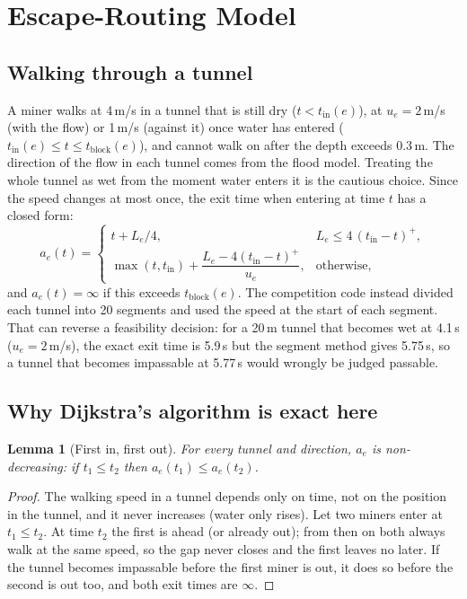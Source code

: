 \documentclass[11pt,a4paper]{article}
\newtheorem{lemma}{Lemma}
\theoremstyle{remark}
\newcommand{\tin}{t_{\mathrm{in}}}
\newcommand{\tblock}{t_{\mathrm{block}}}
\begin{document}
\section{Escape-Routing Model}\label{sec:routing}

\subsection{Walking through a tunnel}
A miner walks at 4\,m/s in a tunnel that is still dry ($t < \tin(e)$), at $u_e = 2$\,m/s (with the flow) or 1\,m/s (against it) once water has entered ($\tin(e) \le t \le \tblock(e)$), and cannot walk on after the depth exceeds 0.3\,m. The direction of the flow in each tunnel comes from the flood model. Treating the whole tunnel as wet from the moment water enters it is the cautious choice. Since the speed changes at most once, the exit time when entering at time $t$ has a closed form:
\begin{equation}
  a_e(t) = \begin{cases}
    t + L_e/4, & L_e \le 4\,(\tin - t)^+,\\[2pt]
    \max(t,\tin) + \dfrac{L_e - 4(\tin - t)^+}{u_e}, & \text{otherwise},
  \end{cases}
  \label{eq:exit}
\end{equation}
and $a_e(t) = \infty$ if this exceeds $\tblock(e)$. The competition code instead divided each tunnel into 20 segments and used the speed at the start of each segment. That can reverse a feasibility decision: for a 20\,m tunnel that becomes wet at 4.1\,s ($u_e = 2$\,m/s), the exact exit time is 5.9\,s but the segment method gives 5.75\,s, so a tunnel that becomes impassable at 5.77\,s would wrongly be judged passable.

\subsection{Why Dijkstra's algorithm is exact here}\label{sec:fifo}

\begin{lemma}[First in, first out]
For every tunnel and direction, $a_e$ is non-decreasing: if $t_1 \le t_2$ then $a_e(t_1) \le a_e(t_2)$.
\end{lemma}
\begin{proof}
The walking speed in a tunnel depends only on time, not on the position in the tunnel, and it never increases (water only rises). Let two miners enter at $t_1 \le t_2$. At time $t_2$ the first is ahead (or already out); from then on both always walk at the same speed, so the gap never closes and the first leaves no later. If the tunnel becomes impassable before the first miner is out, it does so before the second is out too, and both exit times are $\infty$.
\end{proof}
\end{document}
